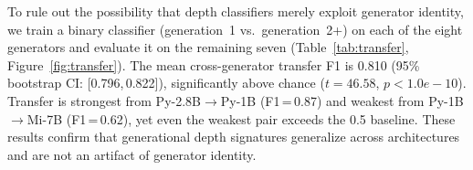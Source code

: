 To rule out the possibility that depth classifiers merely exploit generator identity, we train a binary classifier (generation~1 vs.\ generation~2+) on each of the eight generators and evaluate it on the remaining seven (Table~\ref{tab:transfer}, Figure~\ref{fig:transfer}). The mean cross-generator transfer F1 is 0.810 (95\% bootstrap CI: [0.796,\,0.822]), significantly above chance ($t=46.58$, $p<1.0e-10$). Transfer is strongest from Py-2.8B$\to$Py-1B (F1\,=\,0.87) and weakest from Py-1B$\to$Mi-7B (F1\,=\,0.62), yet even the weakest pair exceeds the 0.5 baseline. These results confirm that generational depth signatures generalize across architectures and are not an artifact of generator identity.
